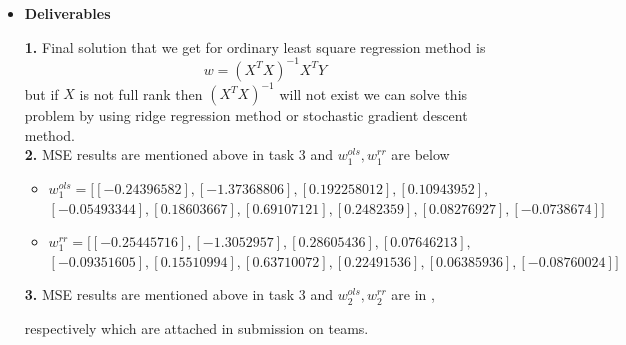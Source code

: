 \documentclass{article}
\begin{document}
\begin{itemize}
    \item \textbf{Deliverables} 
    
        \textbf{1.} Final solution that we get for ordinary least square regression method is
        \[w = (X^TX)^{-1}X^T Y\]
        but if $X$ is not full rank then $(X^TX)^{-1}$ will not exist we can solve this problem by using ridge regression method or stochastic gradient descent method.\vspace{10pt} \\
        \textbf{2.} MSE results are mentioned above in task 3 and $w_1^{ols},w_1^{rr}$ are below
        \begin{itemize}
            \item $w_1^{ols} = [[-0.24396582],[-1.37368806],[ 0.192258012],
 [ 0.10943952],$ \\
            $[-0.05493344],[ 0.18603667],[ 0.69107121],[ 0.2482359 ],[ 0.08276927],[-0.0738674 ]]$ \vspace{7pt}
            \item $w_1^{rr} = [[-0.25445716],
 [-1.3052957 ],
 [ 0.28605436],
 [ 0.07646213],
 $ \\
 $[-0.09351605],
 [ 0.15510994],
 [ 0.63710072],
 [ 0.22491536],
 [ 0.06385936],
 [-0.08760024]]$
        \end{itemize}
    
    \textbf{3.} MSE results are mentioned above in task 3 and $w_2^{ols},w_2^{rr}$ are in  ,  

    \hspace{10pt} respectively which are attached in submission on teams.
\vspace{7pt}
\end{itemize}
\end{document}
